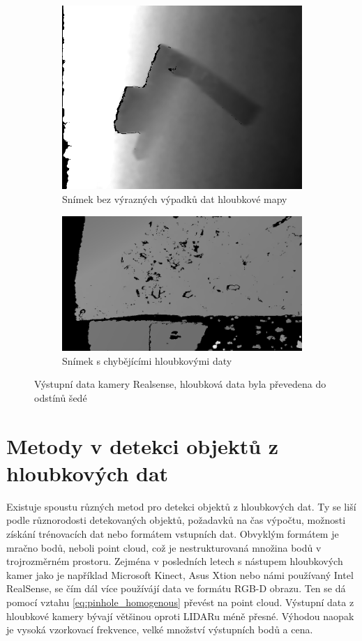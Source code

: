 \documentclass[twoside]{ctuthesis}
\begin{document}
\begin{figure}
\centering
\begin{subfigure}{0.48\textwidth}
  \centering
  \includegraphics[width=0.9\linewidth]{pictures/good_realsense.png}
  \caption{Snímek bez výrazných výpadků dat hloubkové mapy}
  \label{fig:rs_good}
\end{subfigure}
\begin{subfigure}{0.49\textwidth}
  \centering
  \includegraphics[width=0.9\linewidth]{pictures/bad_realsense.png}
  \caption{Snímek s chybějícími hloubkovými daty}
  \label{fig:rs_bad}
\end{subfigure}
\caption{Výstupní data kamery Realsense, hloubková data byla převedena do odstínů šedé}
\label{fig:realsense_pics}
\end{figure}

\section{Metody v detekci objektů z hloubkových dat}
\label{sec:Metody_detekce}
Existuje spoustu různých metod pro detekci objektů z hloubkových dat. Ty se liší podle různorodosti detekovaných objektů, požadavků na čas výpočtu, možnosti získání trénovacích dat nebo formátem vstupních dat. Obvyklým formátem je mračno bodů, neboli point cloud, což je nestrukturovaná množina bodů v trojrozměrném prostoru. Zejména v posledních letech s nástupem hloubkových kamer jako je například Microsoft Kinect, Asus Xtion nebo námi používaný Intel RealSense, se čím dál více používájí data ve formátu RGB-D obrazu. Ten se dá pomocí vztahu \ref{eq:pinhole_homogenous} převést na point cloud. Výstupní data z hloubkové kamery bývají většinou oproti LIDARu méně přesné. Výhodou naopak je vysoká vzorkovací frekvence, velké množství výstupních bodů a cena.
\end{document}
